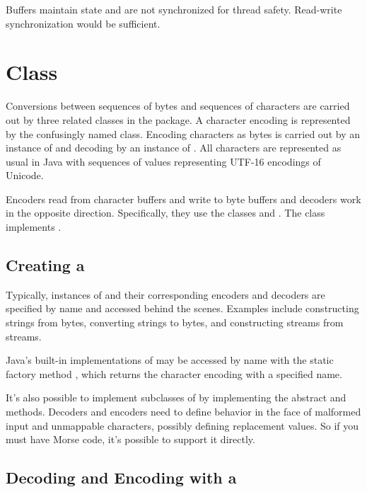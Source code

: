 Buffers maintain state and are not synchronized for thread safety.
Read-write synchronization would be sufficient.

\section{ Class}

Conversions between sequences of bytes and sequences of characters are
carried out by three related classes in the 
package.  A character encoding is represented by the confusingly named
 class.  Encoding characters as bytes is carried out by
an instance of  and decoding by an instance of
.  All characters are represented as usual in
Java with sequences of  values representing UTF-16
encodings of Unicode.

Encoders read from character buffers and write to byte buffers and
decoders work in the opposite direction.  Specifically, they use the
 classes  and .  The
class  implements .

\subsection{Creating a }

Typically, instances of  and their corresponding
encoders and decoders are specified by name and accessed behind the
scenes.  Examples include constructing strings from bytes, converting
strings to bytes, and constructing  streams from
 streams.

Java's built-in implementations of  may be accessed by
name with the static factory method ,
which returns the character encoding with a specified name.  

It's also possible to implement subclasses of  by
implementing the abstract  and 
methods.  Decoders and encoders need to define behavior in the face of
malformed input and unmappable characters, possibly defining
replacement values. So if you must have Morse code, it's possible to
support it directly.  

\subsection{Decoding and Encoding with a }

